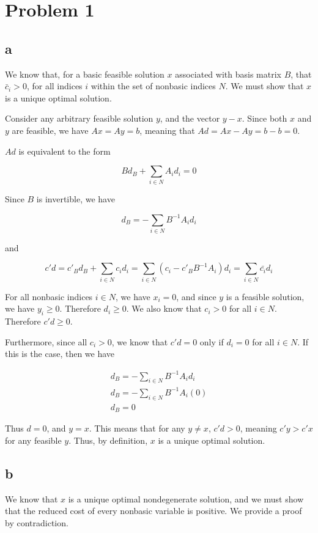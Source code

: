 \documentclass[11pt,a4paper]{article}
\begin{document}
\section{Problem 1}
\subsection{a}
We know that, for a basic feasible solution $x$ associated with basis matrix $B$, that $\bar{c}_i>0$, for all indices $i$ within the set of nonbasic indices $N$. We must show that $x$ is a unique optimal solution.

Consider any arbitrary feasible solution $y$, and the vector $y-x$. Since both $x$ and $y$ are feasible, we have $Ax=Ay=b$, meaning that $Ad=Ax-Ay=b-b=0$.

$Ad$ is equivalent to the form

$$
Bd_B + \sum_{i\in N} A_id_i=0
$$

Since $B$ is invertible, we have 

$$
d_B = -\sum_{i\in N}B^{-1}A_id_i
$$

and

$$
c'd=c'_Bd_B + \sum_{i\in N}c_id_i=\sum_{i\in N}(c_i-c'_BB^{-1}A_i)d_i=\sum_{i\in N}\bar{c_i}d_i
$$

For all nonbasic indices $i\in N$, we have $x_i=0$, and since $y$ is a feasible solution, we have $y_i\geq 0$. Therefore $d_i\geq 0$. We also know that $c_i>0$ for all $i\in N$. Therefore $c'd\geq 0$. 

Furthermore, since all $c_i>0$, we know that $c'd=0$ only if $d_i=0$ for all $i\in N$. If this is the case, then we have 

\begin{equation}
\begin{split}
d_B=-\sum_{i\in N} B^{-1}A_id_i \\
d_B=-\sum_{i\in N} B^{-1}A_i(0) \\
d_B=0
\end{split}
\end{equation}

Thus $d=0$, and $y=x$. This means that for any $y\neq x$, $c'd>0$, meaning $c'y>c'x$ for any feasible $y$. Thus, by definition, $x$ is a unique optimal solution.

\subsection{b}

We know that $x$ is a unique optimal nondegenerate solution, and we must show that the reduced cost of every nonbasic variable is positive. We provide a proof by contradiction.
\end{document}
